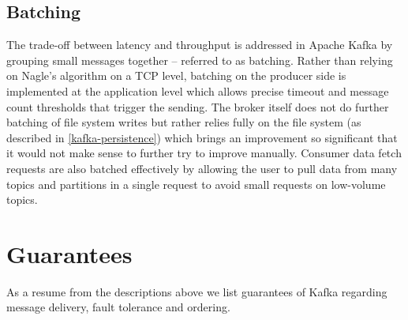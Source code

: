 \subsection{Batching}
\label{intro-kafka-components-batching}

The trade-off between latency and throughput is addressed in Apache Kafka by
grouping small messages together -- referred to as batching. Rather than relying
on Nagle's algorithm on a TCP level, batching on the producer side is implemented
at the application level which allows precise timeout and message count
thresholds that trigger the sending. The broker itself does not do further batching
of file system writes but rather relies fully on the file system (as described in
\ref{kafka-persistence}) which brings an improvement so significant that it would
not make sense to further try to improve manually. Consumer data fetch requests
are also batched effectively by allowing the user to pull data from many
topics and partitions in a single request to avoid small requests on low-volume
topics. \cite{goodhope2012building}

\newpage
\section{Guarantees}
\label{kafka-guarantees}
As a resume from the descriptions above we list guarantees of Kafka regarding
message delivery, fault tolerance and ordering. 

